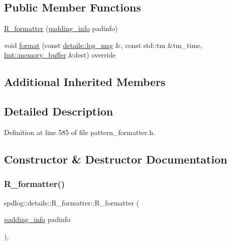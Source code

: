 \subsection*{Public Member Functions}
\begin{DoxyCompactItemize}
\item 
\hyperlink{classspdlog_1_1details_1_1_r__formatter_a712095b0b26244817d78963d98a9a6fb}{R\+\_\+formatter} (\hyperlink{structspdlog_1_1details_1_1padding__info}{padding\+\_\+info} padinfo)
\item 
void \hyperlink{classspdlog_1_1details_1_1_r__formatter_a1fe66a7fbf57ef47faa59e82132e9051}{format} (const \hyperlink{structspdlog_1_1details_1_1log__msg}{details\+::log\+\_\+msg} \&, const std\+::tm \&tm\+\_\+time, \hyperlink{format_8h_a21cbf729f69302f578e6db21c5e9e0d2}{fmt\+::memory\+\_\+buffer} \&dest) override
\end{DoxyCompactItemize}
\subsection*{Additional Inherited Members}


\subsection{Detailed Description}


Definition at line 585 of file pattern\+\_\+formatter.\+h.



\subsection{Constructor \& Destructor Documentation}
\mbox{\label{classspdlog_1_1details_1_1_r__formatter_a712095b0b26244817d78963d98a9a6fb}} 
\subsubsection{\texorpdfstring{R\+\_\+formatter()}{R\_formatter()}}
{\footnotesize\ttfamily spdlog\+::details\+::\+R\+\_\+formatter\+::\+R\+\_\+formatter (\begin{DoxyParamCaption}\item[{\hyperlink{structspdlog_1_1details_1_1padding__info}{padding\+\_\+info}}]{padinfo }\end{DoxyParamCaption})\hspace{0.3cm}{\ttfamily [inline]}, {\ttfamily [explicit]}}



